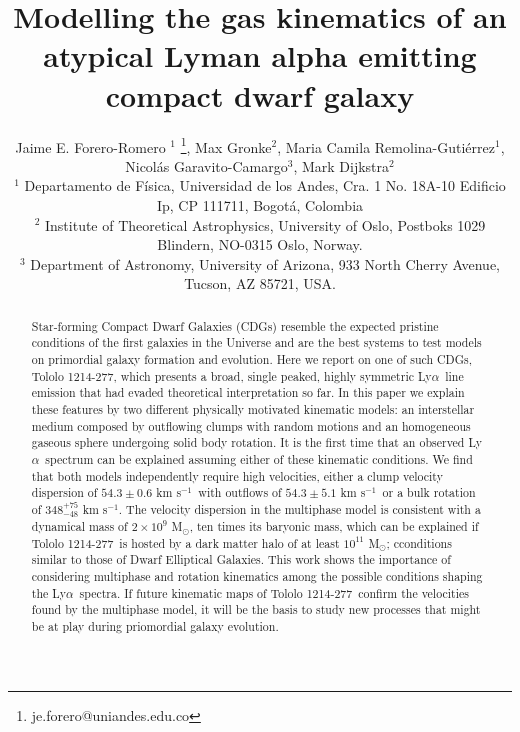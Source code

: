 \documentclass[a4,useAMS,usenatbib,usegraphicx]{mn2e}
\newcommand{\tol}{Tololo 1214-277}
\newcommand{\lya}{Ly$\alpha$}
\newcommand{\sigmaclump}{$54.3\pm 0.6$ km s$^{-1}$}
\newcommand{\inftyclump}{$54.3\pm 5.1$ km s$^{-1}$}
\begin{document}
\title[An atypical \lya\ dwarf galaxy]{
Modelling the gas kinematics of an atypical Lyman alpha emitting compact dwarf galaxy}
\author[J.E. Forero-Romero et al.]
{Jaime E. Forero-Romero $^{1}$ \thanks{je.forero@uniandes.edu.co},
Max Gronke$^2$, 
Maria Camila Remolina-Guti\'errez$^1$,
\newauthor
Nicol\'as Garavito-Camargo$^3$, 
Mark Dijkstra$^2$\\
$^1$ Departamento de F\'isica, Universidad de los Andes, Cra. 1
  No. 18A-10 Edificio Ip, CP 111711, Bogot\'a, Colombia \\
$^2$ Institute of Theoretical Astrophysics, University of Oslo,
Postboks 1029 Blindern, NO-0315 Oslo, Norway.\\
$^3$ Department of Astronomy, University of Arizona, 933 North Cherry
Avenue, Tucson, AZ 85721, USA. 
}


\maketitle


\begin{abstract}
  Star-forming Compact Dwarf Galaxies (CDGs) resemble the expected
  pristine conditions of the first galaxies in the Universe and
  are the best systems to test models on primordial
galaxy formation and evolution.    
Here we report on one of such CDGs, \tol, which presents
a broad, single peaked, highly symmetric \lya\ line emission that had
evaded theoretical interpretation so far.  
In this paper we explain these features by two different physically
motivated kinematic models: 
an interstellar medium composed by outflowing clumps with 
random motions and an homogeneous gaseous sphere undergoing solid body
rotation.
It is the first time that an observed \lya\ spectrum can be explained
assuming either of these kinematic conditions.
We find that both models independently require high velocities, either
a clump velocity dispersion of \sigmaclump\ with outflows of
\inftyclump\ or a bulk rotation of $348^{+75}_{-48}$ km s$^{-1}$. 
The velocity dispersion in the multiphase model is consistent with a dynamical
mass of $2\times 10^{9}$ M$_{\odot}$, ten times its baryonic mass,
which can be explained if \tol\ is hosted by a dark matter halo of at least
$10^{11}$ M$_{\odot}$; cconditions similar to those of Dwarf Elliptical Galaxies.
This work shows the importance of considering multiphase
and rotation kinematics among the possible conditions shaping the
\lya\ spectra.
If future kinematic maps of \tol\ confirm the velocities found by the
multiphase model, it will be the basis to study new processes that
might be at play during priomordial galaxy evolution.
\end{abstract}
\end{document}

